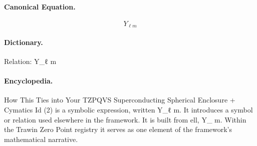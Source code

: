 \paragraph{Canonical Equation.}
\[
Y_{\ell m}
\]

\paragraph{Dictionary.}
Relation: Y\_ℓ m

\paragraph{Encyclopedia.}
How This Ties into Your TZPQVS Superconducting Spherical Enclosure + Cymatics Id (2) is a symbolic expression, written Y\_ℓ m. It introduces a symbol or relation used elsewhere in the framework. It is built from ell, Y\_ m. Within the Trawin Zero Point registry it serves as one element of the framework's mathematical narrative.

